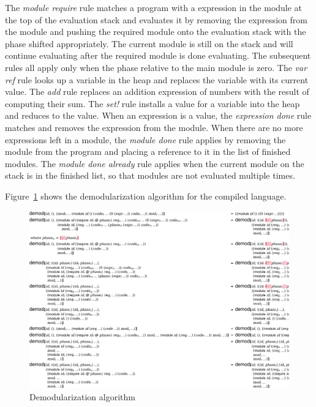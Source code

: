 The \emph{module require} rule matches a program with a  expression in the module at the top of the evaluation stack and evaluates it by removing the  expression from the module and pushing the required module onto the evaluation stack with the phase shifted appropriately.
The current module is still on the stack and will continue evaluating after the required module is done evaluating.
The subsequent rules all apply only when the phase relative to the main module is zero.
The \emph{var ref} rule looks up a variable in the heap and replaces the variable with its current value.
The \emph{add} rule replaces an addition expression of numbers with the result of computing their sum.
The \emph{set!} rule installs a value for a variable into the heap and reduces to the value.
When an expression is a value, the \emph{expression done} rule matches and removes the expression from the module.
When there are no more expressions left in a module, the \emph{module done} rule applies by removing the module from the program and placing a reference to it in the list of finished modules.
The \emph{module done already} rule applies when the current module on the stack is in the finished list, so that modules are not evaluated multiple times. 

Figure~\ref{demod-redex} shows the demodularization algorithm for the compiled language.
\begin{figure}[h]
\includegraphics[width=\textwidth]{demod-redex}
\caption{Demodularization algorithm}
\label{demod-redex}
\end{figure}

